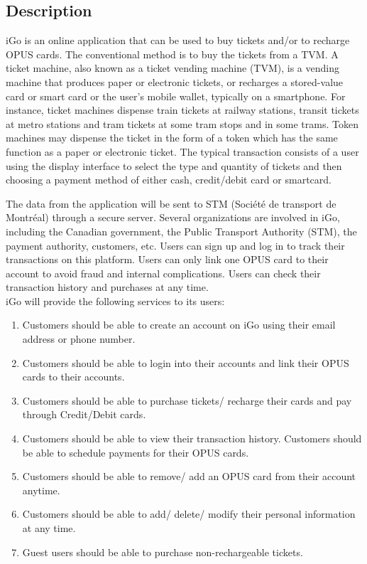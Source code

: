 \documentclass[a4paper,12pt]{article}
\begin{document}
\subsection{Description}
iGo is an online application that can be used to buy tickets and/or to recharge OPUS cards. The conventional method is to buy the tickets from a TVM. A ticket machine, also known as a ticket vending machine (TVM), is a vending machine that produces paper or electronic tickets, or recharges a stored-value card or smart card or the user's mobile wallet, typically on a smartphone. For instance, ticket machines dispense train tickets at railway stations, transit tickets at metro stations and tram tickets at some tram stops and in some trams.  Token machines may dispense the ticket in the form of a token which has the same function as a paper or electronic ticket. The typical transaction consists of a user using the display interface to select the type and quantity of tickets and then choosing a payment method of either cash, credit/debit card or smartcard.\\ \par
The data from the application will be sent to STM (Société de transport de Montréal) through a secure server. Several organizations are involved in iGo, including the Canadian government, the Public Transport Authority (STM), the payment authority, customers, etc. Users can sign up and log in to track their transactions on this platform. Users can only link one OPUS card to their account to avoid fraud and internal complications. Users can check their transaction history and purchases at any time. \\
iGo will provide the following services to its users:
\begin{enumerate}

\item Customers should be able to create an account on iGo using their email address or phone number. 
\item Customers should be able to login into their accounts and link their OPUS cards to their accounts.
\item Customers should be able to purchase tickets/ recharge their cards and pay through Credit/Debit cards.
\item Customers should be able to view their transaction history.
Customers should be able to schedule payments for their OPUS cards.
\item Customers should be able to remove/ add an OPUS card from their account anytime.
\item Customers should be able to add/ delete/ modify their personal information at any time.
\item Guest users should be able to purchase non-rechargeable tickets.\\
\end{enumerate}
\end{document}
